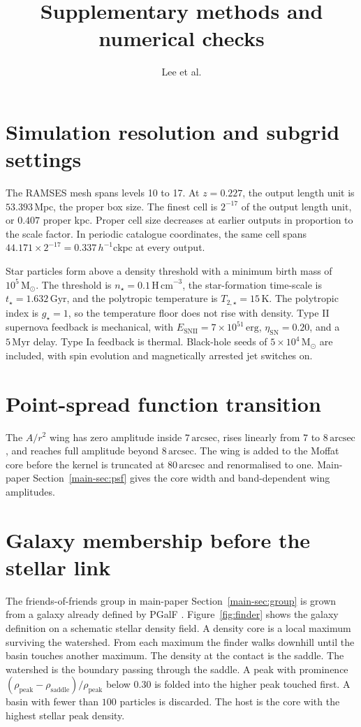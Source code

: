 \documentclass[usenatbib]{mnras}
\title{Supplementary methods and numerical checks}
\author{Lee et al.}
\begin{document}
\maketitle
\section{Simulation resolution and subgrid settings}
The RAMSES mesh spans levels 10 to 17. At $z=0.227$, the output length
unit is $53.393\,\mathrm{Mpc}$, the proper box size. The finest cell is
$2^{-17}$ of the output length unit, or $0.407$ proper kpc. Proper cell
size decreases at earlier outputs in proportion to the scale factor.
In periodic catalogue coordinates, the same cell spans
$44.171\times 2^{-17}=0.337\,h^{-1}\mathrm{ckpc}$ at every output.

Star particles form above a density threshold with a minimum birth mass
of $10^{5}\,\mathrm{M}_{\odot}$. The threshold is
$n_{\star}=0.1\,\mathrm{H\,cm}^{-3}$, the star-formation time-scale is
$t_{\star}=1.632\,\mathrm{Gyr}$, and the polytropic temperature is
$T_{2,\star}=15\,\mathrm{K}$. The polytropic index is $g_{\star}=1$,
so the temperature floor does not rise with density. Type II supernova
feedback is mechanical, with $E_{\mathrm{SNII}}=7\times10^{51}\,\mathrm{erg}$,
$\eta_{\mathrm{SN}}=0.20$, and a $5\,\mathrm{Myr}$ delay. Type Ia
feedback is thermal. Black-hole seeds of $5\times10^{4}\,\mathrm{M}_{\odot}$
are included, with spin evolution and magnetically arrested jet
switches on.

\section{Point-spread function transition}
\label{sec:psfwing}
The $A/r^{2}$ wing has zero amplitude inside $7\,\mathrm{arcsec}$,
rises linearly from $7$ to $8\,\mathrm{arcsec}$, and reaches full
amplitude beyond $8\,\mathrm{arcsec}$. The wing is added to the Moffat
core before the kernel is truncated at $80\,\mathrm{arcsec}$ and
renormalised to one. Main-paper Section~\ref{main-sec:psf} gives the
core width and band-dependent wing amplitudes.

\section{Galaxy membership before the stellar link}
The friends-of-friends group in main-paper Section~\ref{main-sec:group} is grown from a
galaxy already defined by PGalF \citep{kim2023}.
Figure~\ref{fig:finder} shows the galaxy definition on a schematic stellar
density field.
A density core is a local maximum surviving the watershed.
From each maximum the finder walks downhill until the basin touches
another maximum.
The density at the contact is the saddle.
The watershed is the boundary passing through the saddle.
A peak with prominence
$(\rho_{\mathrm{peak}}-\rho_{\mathrm{saddle}})/\rho_{\mathrm{peak}}$
below $0.30$ is folded into the higher peak touched first.
A basin with fewer than $100$ particles is discarded.
The host is the core with the highest stellar peak density.
\end{document}
